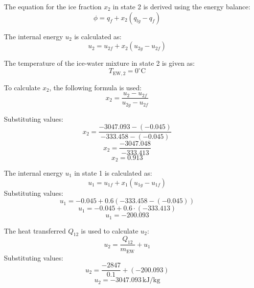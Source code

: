 The equation for the ice fraction \( x_2 \) in state 2 is derived using the energy balance:  
\[
\phi = q_f + x_2 \left( q_{lg} - q_f \right)
\]  

The internal energy \( u_2 \) is calculated as:  
\[
u_2 = u_{2f} + x_2 \left( u_{2g} - u_{2f} \right)
\]  

The temperature of the ice-water mixture in state 2 is given as:  
\[
T_{\text{EW},2} = 0^\circ\text{C}
\]  

To calculate \( x_2 \), the following formula is used:  
\[
x_2 = \frac{u_2 - u_{2f}}{u_{2g} - u_{2f}}
\]  

Substituting values:  
\[
x_2 = \frac{-3047.093 - (-0.045)}{-333.458 - (-0.045)}
\]  
\[
x_2 = \frac{-3047.048}{-333.413}
\]  
\[
x_2 = 0.913
\]  

The internal energy \( u_1 \) in state 1 is calculated as:  
\[
u_1 = u_{1f} + x_1 \left( u_{1g} - u_{1f} \right)
\]  
Substituting values:  
\[
u_1 = -0.045 + 0.6 \left( -333.458 - (-0.045) \right)
\]  
\[
u_1 = -0.045 + 0.6 \cdot (-333.413)
\]  
\[
u_1 = -200.093
\]  

The heat transferred \( Q_{12} \) is used to calculate \( u_2 \):  
\[
u_2 = \frac{Q_{12}}{m_{\text{EW}}} + u_1
\]  
Substituting values:  
\[
u_2 = \frac{-2847}{0.1} + (-200.093)
\]  
\[
u_2 = -3047.093 \, \text{kJ/kg}
\]
